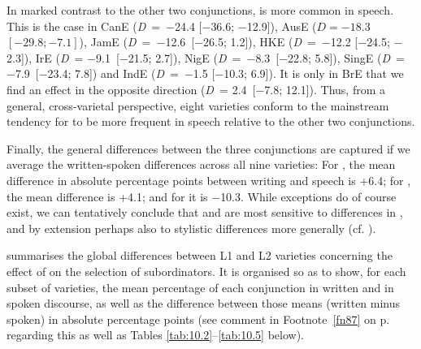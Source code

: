In marked contrast to the other two conjunctions,  is more common in speech. This is the case in CanE (\textit{D}~=~$-$24.4 [$-$36.6; $-$12.9]), AusE ($D = -18.3$ $[-29.8;\allowbreak -7.1]$), JamE (\textit{D}~=~$-$12.6~[$-$26.5; 1.2]), HKE (\textit{D}~=~$-$12.2 [$-$24.5; $-$2.3]), IrE (\textit{D}~= $-$9.1~[$-$21.5; 2.7]), NigE (\textit{D}~=~$-$8.3~[$-$22.8; 5.8]), SingE (\textit{D}~=~$-$7.9~[$-$23.4; 7.8]) and IndE (\textit{D}~=~$-$1.5 [$-$10.3; 6.9]). It is only in BrE that we find an effect in the opposite direction (\textit{D~}= 2.4~[$-$7.8; 12.1]). Thus, from a general, cross-varietal perspective, eight varieties conform to the mainstream tendency for  to be more frequent in speech relative to the other two conjunctions.\largerpage

Finally, the general differences between the three conjunctions are captured if we average the written-spoken differences across all nine varieties: For , the mean difference in absolute percentage points between writing and speech is +6.4; for , the mean difference is +4.1; and for  it is $-$10.3. While exceptions do of course exist, we can tentatively conclude that  and  are most sensitive to differences in , and by extension perhaps also to stylistic differences more generally (cf. ).

 summarises the global differences between L1 and L2 varieties concerning the effect of  on the selection of subordinators. It is organised so as to show, for each subset of varieties, the mean percentage of each conjunction in written and in spoken discourse, as well as the difference between those means (written minus spoken) in absolute percentage points (see comment in Footnote~\ref{fn87} on p. \pageref{fn87} regarding this as well as Tables \ref{tab:10.2}–\ref{tab:10.5} below).


